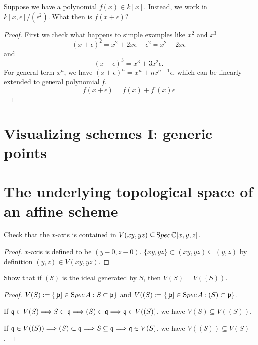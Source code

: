 \documentclass[11pt,fleqn]{book}
\begin{document}
\begin{exr}
Suppose we have a polynomial $ f(x) \in k[x]$. Instead, we work in $k[x, \epsilon]/(\epsilon^2)$. What then is $f(x + \epsilon)$?
\end{exr}
\begin{proof}
First we check what happens to simple examples like $x^2$ and $x^3$
$$
(x+\epsilon)^2=x^2+2x\epsilon +\epsilon^2=x^2+2x \epsilon
$$
and
$$
(x+\epsilon)^3=x^3+3x^2\epsilon.
$$
For general term $x^n$, we have $(x+\epsilon)^n=x^n+nx^{n-1}\epsilon$, which can be linearly extended to general polynomial $f$.
$$
f(x+\epsilon)=f(x)+f'(x)\epsilon
$$

\end{proof}

\section{Visualizing schemes I: generic points}
\section{The underlying topological space of an affine scheme}
\begin{exr}
Check that the $x$-axis is contained in $V(xy, yz)\subseteq {\text Spec\,}\mathbb C[x,y,z]$.
\end{exr}
\begin{proof}
$x$-axis is defined to be $(y-0,z-0)$. $\{xy,yz\}\subset (xy,yz)\subseteq (y,z)$ by definition $(y,z)\in V(xy,yz)$.
\end{proof}

\begin{exr}
Show that if $(S)$ is the ideal generated by $S$, then $V(S) =
V ((S))$.
\end{exr}
\begin{proof}
$V(S):=\{[{\mathfrak p}]\in {\text Spec\,} A: S\subset{\mathfrak p}\}$ and $V((S):=\{[{\mathfrak p}]\in {\text Spec\,} A: (S)\subset{\mathfrak p}\}$.

 If $\mathfrak q\in V(S)\Longrightarrow S\subset\mathfrak q\Longrightarrow (S)\subset\mathfrak q\Longrightarrow \mathfrak q\in V((S))$, we have $V(S)\subseteq V((S))$.

 If $\mathfrak q\in V((S))\Longrightarrow (S)\subset\mathfrak q\Longrightarrow S\subseteq \mathfrak q\Longrightarrow \mathfrak q\in V(S)$, we have $V((S))\subseteq V(S)$.
\end{proof}
\end{document}
